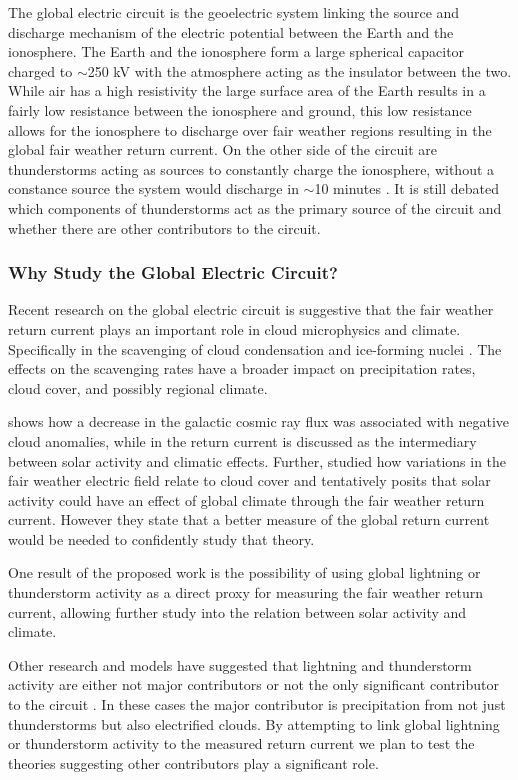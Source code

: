 The global electric circuit is the geoelectric system linking the source and discharge mechanism of the electric potential between the Earth and the ionosphere.
The Earth and the ionosphere form a large spherical capacitor charged to $\sim$250 kV with the atmosphere acting as the insulator between the two.
While air has a high resistivity the large surface area of the Earth results in a fairly low resistance between the ionosphere and ground, this low resistance allows for the ionosphere to discharge over fair weather regions resulting in the global fair weather return current.
On the other side of the circuit are thunderstorms acting as sources to constantly charge the ionosphere, without a constance source the system would discharge in $\sim$10 minutes \citep{Volland1984}.
It is still debated which components of thunderstorms act as the primary source of the circuit and whether there are other contributors to the circuit.

\subsubsection*{Why Study the Global Electric Circuit?}

Recent research on the global electric circuit is suggestive that the fair weather return current plays an important role in cloud microphysics and climate.
Specifically in the scavenging of cloud condensation and ice-forming nuclei \citep{Tinsley2007}.
The effects on the scavenging rates have a broader impact on precipitation rates, cloud cover, and possibly regional climate. 
 
\citet{Kniveton2004} shows how a decrease in the galactic cosmic ray flux was associated with negative cloud anomalies, while in \citet{Siingh2007} the return current is discussed as the intermediary between solar activity and climatic effects.
Further, \citet{Kniveton2008} studied how variations in the fair weather electric field relate to cloud cover and tentatively posits that solar activity could have an effect of global climate through the fair weather return current.
However they state that a better measure of the global return current would be needed to confidently study that theory.
 
One result of the proposed work is the possibility of using global lightning or thunderstorm activity as a direct proxy for measuring the fair weather return current, allowing further study into the relation between solar activity and climate.

Other research and models have suggested that lightning and thunderstorm activity are either not major contributors or not the only significant contributor to the circuit \citep{Rycroft2008,Liu2010}.
In these cases the major contributor is precipitation from not just thunderstorms but also electrified clouds.
By attempting to link global lightning or thunderstorm activity to the measured return current we plan to test the theories suggesting other contributors play a significant role.


